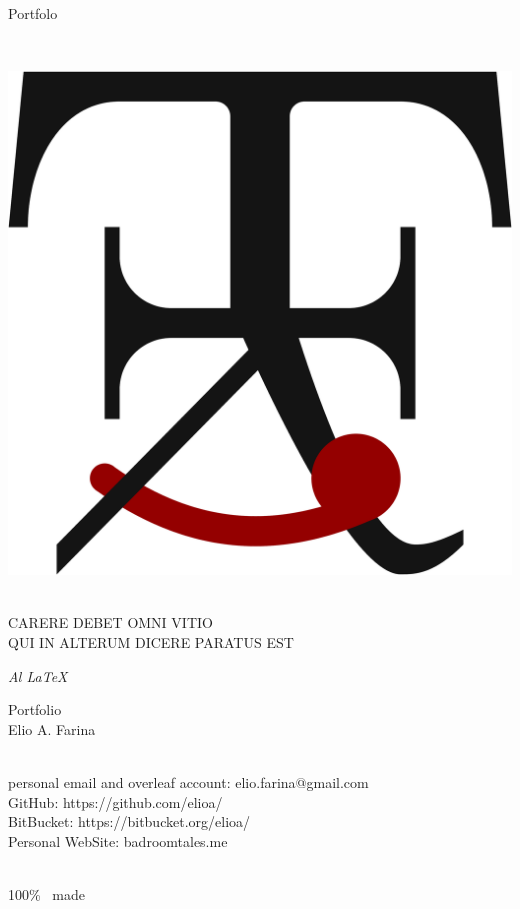 

    \begin{center}
        {\fontsize{50pt}{20pt}\selectfont\color{COLV}Portfol\blackcolouri o}\\
        \strut\\
    \end{center}
    \vfill
    \begin{center}
    \includegraphics[width=0.3\linewidth]{./TikZimages/logoofficial.pdf}\\
    {\small\trjnfamily \strut\\ CARERE DEBET OMNI VITIO\\ QUI IN ALTERUM DICERE PARATUS EST}
    \end{center}

\clearpage
    \begin{flushright}
        \textit{\huge Al \LaTeX}

        \vfill
        \huge
        Portfolio\\
        Elio A. Farina\\
        \LARGE
        \strut\\
        personal email and overleaf account: elio.farina@gmail.com\\
        GitHub: https://github.com/elioa/\\
        BitBucket: https://bitbucket.org/elioa/\\
        Personal WebSite: badroomtales.me\\
        \strut\\
        100\% \LaTeXe\ made
    \end{flushright}


    
    
    
    
    
    
    
    
    

